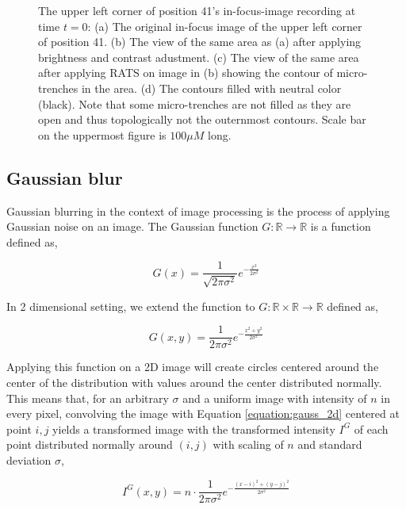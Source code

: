 \documentclass[pdftex,12pt,a4paper]{report}
\begin{document}
\begin{figure}[H]
\caption{The upper left corner of position 41's in-focus-image recording at time $t=0$: (a) The original in-focus image of the upper left corner of position 41. (b) The view of the same area as (a) after applying brightness and contrast adustment. (c) The view of the same area after applying RATS on image in (b) showing the contour of micro-trenches in the area. (d) The contours filled with neutral color (black). Note that some micro-trenches are not filled as they are open and thus topologically not the outernmost contours. Scale bar on the uppermost figure is $100 \mu M$ long.}

\label{fig:trench_masking}
\end{figure}

\subsection{Gaussian blur}
\label{subsection:gaussian_blur}

Gaussian blurring in the context of image processing is  the process of applying Gaussian noise on an image. The Gaussian function $G: \mathbb{R} \rightarrow \mathbb{R}$ is a function defined as,

$$
G(x) = \frac{1}{\sqrt{2\pi \sigma^2}} e^{-\frac{x^2}{2 \sigma^2}}
$$

In 2 dimensional setting, we extend the function to $G: \mathbb{R} \times \mathbb{R} \rightarrow \mathbb{R}$ defined as,

\begin{equation}
G(x,y) = \frac{1}{{2\pi \sigma^2}} e^{-\frac{x^2 + y^2}{2 \sigma^2}}
\label{equation:gauss_2d}
\end{equation}

Applying this function on a 2D image will create circles centered around the center of the distribution with values around the center distributed normally. This means that, for an arbitrary $\sigma$  and a uniform image with intensity of $n$ in every pixel,  convolving the image with Equation \ref{equation:gauss_2d} centered at point $i, j$ yields a transformed image with the transformed intensity $I^G$ of each point distributed normally around $(i, j)$ with scaling of $n$ and standard deviation $\sigma$,

\begin{equation}
I^G(x, y) = n \cdot \frac{1}{{2\pi \sigma^2}} e^{-\frac{(x - i)^2 + (y - j)^2}{2 \sigma^2}}
\label{equation:gauss_intens_trans}
\end{equation}
\end{document}
